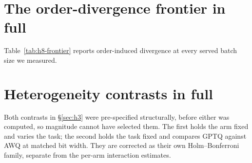 \documentclass[11pt]{article}
\begin{document}
\section{The order-divergence frontier in full}
\label{app:h8frontier}


Table~\ref{tab:h8-frontier} reports order-induced divergence at every served batch
size we measured.

\begin{table}[t]
\centering
\small

\caption{Order-induced divergence at three measurement levels (generated
text, and correctness under strict and permissive extraction) by served
batch size $B$, on \hEightItems{} items with \hEightOrderings{} orderings. This
bounds what a third party can reproduce at each configuration, which is why we
report the whole frontier rather than only the value we adopt.}
\label{tab:h8-frontier}
\end{table}

\section{Heterogeneity contrasts in full}
\label{app:h3het}


Both contrasts in \S\ref{sec:h3} were pre-specified structurally, before either
was computed, so magnitude cannot have selected them. The first holds the arm
fixed and varies the task; the second holds the task fixed and compares GPTQ
against AWQ at matched bit width. They are corrected as their own
Holm--Bonferroni family, separate from the per-arm interaction estimates.
\end{document}

